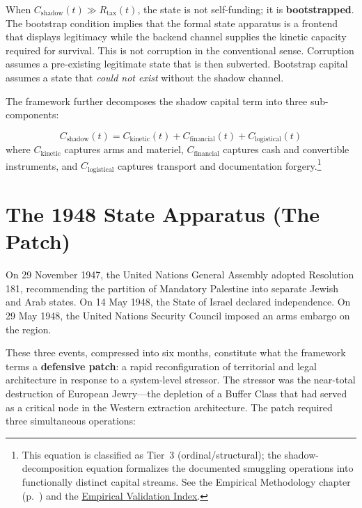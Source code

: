 When $C_{\text{shadow}}(t) \gg R_{\text{tax}}(t)$, the state is not self-funding; it is \textbf{bootstrapped}. The bootstrap condition implies that the formal state apparatus is a frontend that displays legitimacy while the backend channel supplies the kinetic capacity required for survival. This is not corruption in the conventional sense. Corruption assumes a pre-existing legitimate state that is then subverted. Bootstrap capital assumes a state that \textit{could not exist} without the shadow channel.

The framework further decomposes the shadow capital term into three sub-components:

\begin{equation}\label{eq:gp0b-shadow-decomposition}
C_{\text{shadow}}(t) = C_{\text{kinetic}}(t) + C_{\text{financial}}(t) + C_{\text{logistical}}(t)
\end{equation}
where $C_{\text{kinetic}}$ captures arms and materiel, $C_{\text{financial}}$ captures cash and convertible instruments, and $C_{\text{logistical}}$ captures transport and documentation forgery.\footnote{This equation is classified as Tier~3 (ordinal/structural); the shadow-decomposition equation formalizes the documented smuggling operations into functionally distinct capital streams. See the Empirical Methodology chapter (p.~\pageref{ch:empirical_methodology}) and the \hyperref[app:empirical_index]{Empirical Validation Index}.}

\section{The 1948 State Apparatus (The Patch)}

On 29 November 1947, the United Nations General Assembly adopted Resolution 181, recommending the partition of Mandatory Palestine into separate Jewish and Arab states. On 14 May 1948, the State of Israel declared independence. On 29 May 1948, the United Nations Security Council imposed an arms embargo on the region.

These three events, compressed into six months, constitute what the framework terms a \textbf{defensive patch}: a rapid reconfiguration of territorial and legal architecture in response to a system-level stressor. The stressor was the near-total destruction of European Jewry---the depletion of a Buffer Class that had served as a critical node in the Western extraction architecture. The patch required three simultaneous operations:


